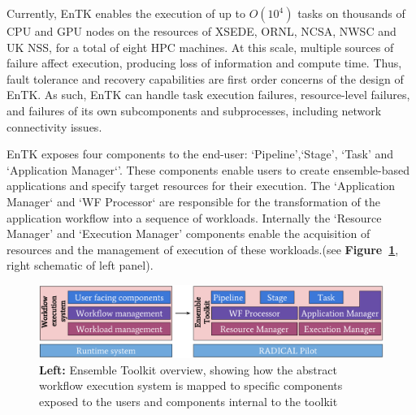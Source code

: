 Currently, EnTK enables the execution of up to \(O(10^4)\) tasks on thousands
of CPU and GPU nodes on the resources of XSEDE, ORNL, NCSA, NWSC and UK NSS,
for a total of eight HPC machines. At this scale, multiple sources of failure
affect execution, producing loss of information and compute time. Thus, fault
tolerance and recovery capabilities are first order concerns of the design of
EnTK\@. As such, EnTK can handle task execution failures, resource-level
failures, and failures of its own subcomponents and subprocesses, including
network connectivity issues.

EnTK exposes four components to the end-user: `Pipeline',`Stage', `Task' and 
`Application Manager`'. These components enable users to create ensemble-based 
applications and specify target resources for their execution. The 
`Application Manager` and `WF Processor` are responsible for the transformation
of the application workflow into a sequence of workloads. Internally the 
`Resource Manager' and `Execution Manager' components enable the acquisition of
resources and the management of execution of these workloads.(see
\textbf{Figure~\ref{fig:entk_arch}}, right schematic of left panel).

\begin{figure}[!htbp]
  \begin{minipage}[b]{0.49\textwidth}
  \centering
  \includegraphics[width=\textwidth]{FIGURES/entk_overview.pdf}
  \end{minipage}
  \caption{\textbf{Left:} Ensemble Toolkit overview, showing how the abstract
           workflow execution system is mapped to specific components exposed
           to the users and components internal to the toolkit
           }\label{fig:entk_arch}
\end{figure}

